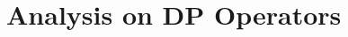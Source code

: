 \documentclass{acml}
\providecommand{\x}{\times}
\begin{document}
\section{Analysis on DP Operators}\label{sec:BucareyMethod}





\end{document}
